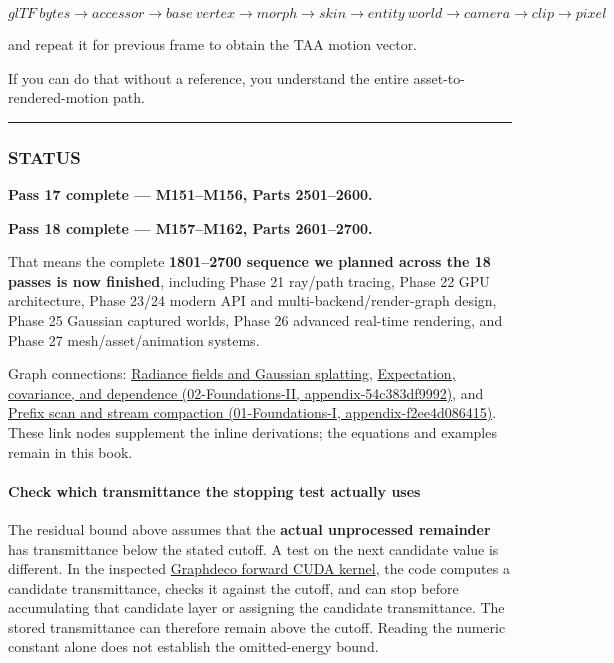 \[
\boxed{
glTF\ bytes
\rightarrow
accessor
\rightarrow
base\ vertex
\rightarrow
morph
\rightarrow
skin
\rightarrow
entity\ world
\rightarrow
camera
\rightarrow
clip
\rightarrow
pixel
}
\]

and repeat it for previous frame to obtain the TAA motion vector.

If you can do that without a reference, you understand the entire asset-to-rendered-motion path.

\begin{center}\rule{0.5\linewidth}{0.5pt}\end{center}

\subsubsection{STATUS}\label{status}

\textbf{Pass 17 complete --- M151--M156, Parts 2501--2600.}

\textbf{Pass 18 complete --- M157--M162, Parts 2601--2700.}

That means the complete \textbf{1801--2700 sequence we planned across the 18 passes is now finished}, including Phase 21 ray/path tracing, Phase 22 GPU architecture, Phase 23/24 modern API and multi-backend/render-graph design, Phase 25 Gaussian captured worlds, Phase 26 advanced real-time rendering, and Phase 27 mesh/asset/animation systems.

Graph connections: \hyperref[appendix-c5b332e400e7]{Radiance fields and Gaussian splatting}, \href{}{Expectation, covariance, and dependence (02-Foundations-II, appendix-54c383df9992)}, and \href{}{Prefix scan and stream compaction (01-Foundations-I, appendix-f2ee4d086415)}. These link nodes supplement the inline derivations; the equations and examples remain in this book.

\paragraph{Check which transmittance the stopping test actually uses}\label{check-which-transmittance-the-stopping-test-actually-uses}

The residual bound above assumes that the \textbf{actual unprocessed remainder} has transmittance below the stated cutoff. A test on the next candidate value is different. In the inspected \href{https://github.com/graphdeco-inria/diff-gaussian-rasterization/blob/main/cuda_rasterizer/forward.cu}{Graphdeco forward CUDA kernel}, the code computes a candidate transmittance, checks it against the cutoff, and can stop before accumulating that candidate layer or assigning the candidate transmittance. The stored transmittance can therefore remain above the cutoff. Reading the numeric constant alone does not establish the omitted-energy bound.

